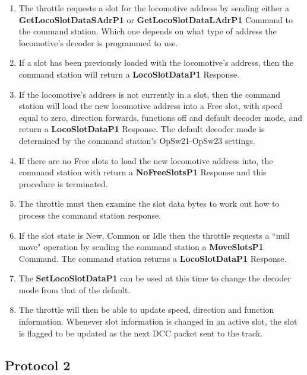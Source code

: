 \begin{enumerate}
\item The throttle requests a slot for the locomotive \gls{address} by sending either a \textbf{GetLocoSlotDataSAdrP1} or \textbf{GetLocoSlotDataLAdrP1} \gls{Command} to the command station. Which one depends on what type of address the locomotive's decoder is programmed to use. 
\item If a slot has been previously loaded with the locomotive's address, then the command station will return a \textbf{LocoSlotDataP1} \gls{Response}.
\item If the locomotive's address is not currently in a slot, then the command station will load the new locomotive address into a Free slot, with speed equal to zero, direction forwards, functions off and default decoder mode, and return a \textbf{LocoSlotDataP1} \gls{Response}. The default decoder mode is determined by the command station's OpSw21-OpSw23 settings.
\item If there are no Free slots to load the new locomotive address into, the command station with return a \textbf{NoFreeSlotsP1} \gls{Response} and this procedure is terminated.
\item The throttle must then examine the slot data bytes to work out how to process the command station response.
\item If the slot state is New, Common or Idle then the throttle requests a ``null move" operation by sending the command station a \textbf{MoveSlotsP1} \gls{Command}. The command station returns a \textbf{LocoSlotDataP1} \gls{Response}. 
\item The \textbf{SetLocoSlotDataP1} can be used at this time to change the decoder mode from that of the default.
\item The throttle will then be able to update speed, direction and function information. Whenever slot information is changed in an active slot, the slot is flagged to be updated as the next DCC packet sent to the track. 
\end{enumerate}

\subsection{Protocol 2}


